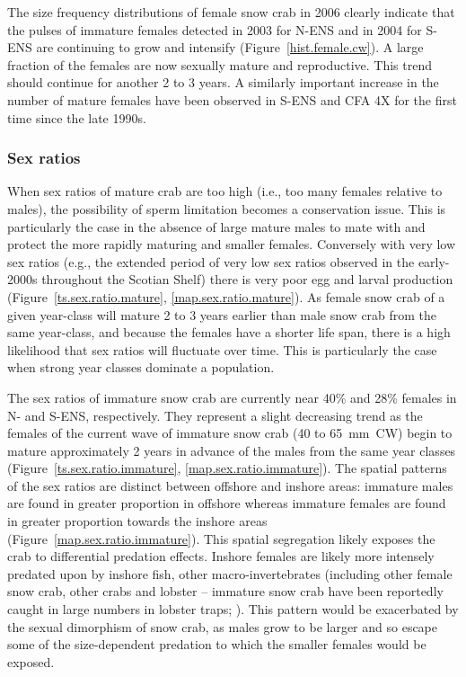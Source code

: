 \documentclass[11pt]{article}
\begin{document}
The size frequency distributions of female snow crab in 2006 clearly indicate that the pulses of immature females detected in 2003 for N-ENS and in 2004 for S-ENS are continuing to grow and intensify (Figure~\ref{hist.female.cw}). A large fraction of the females are now sexually mature and reproductive. This trend should continue for another 2 to 3 years. A similarly important increase in the number of mature females have been observed in S-ENS and CFA 4X for the first time since the late 1990s. 


\subsubsection{Sex ratios}

When sex ratios of mature crab are too high (i.e., too many females relative to males), the possibility of sperm limitation becomes a conservation issue. This is particularly the case in the absence of large mature males to mate with and protect the more rapidly maturing and smaller females. Conversely with very low sex ratios (e.g., the extended period of very low sex ratios observed in the early-2000s throughout the Scotian Shelf) there is very poor egg and larval production (Figure~\ref{ts.sex.ratio.mature}, \ref{map.sex.ratio.mature}). As female snow crab of a given year-class will mature 2 to 3 years earlier than male snow crab from the same year-class, and because the females have a shorter life span, there is a high likelihood that sex ratios will fluctuate over time. This is particularly the case when strong year classes dominate a population.

The sex ratios of immature snow crab are currently near 40\% and 28\% females in N- and S-ENS, respectively. They represent a slight decreasing trend as the females of the current wave of immature snow crab (40 to 65~mm~CW) begin to mature approximately 2 years in advance of the males from the same year classes (Figure~\ref{ts.sex.ratio.immature}, \ref{map.sex.ratio.immature}). The spatial patterns of the sex ratios are distinct between offshore and inshore areas: immature males are found in greater proportion in offshore whereas immature females are found in greater proportion towards the inshore areas (Figure~\ref{map.sex.ratio.immature}). This spatial segregation likely exposes the crab to differential predation effects. Inshore females are likely more intensely predated upon by inshore fish, other macro-invertebrates (including other female snow crab, other crabs and lobster -- immature snow crab have been reportedly caught in large numbers in lobster traps; \citealt{Sainte-Marie2002, Squires2003}). This pattern would be exacerbated by the sexual dimorphism of snow crab, as males grow to be larger and so escape some of the size-dependent predation to which the smaller females would be exposed. 
\end{document}
